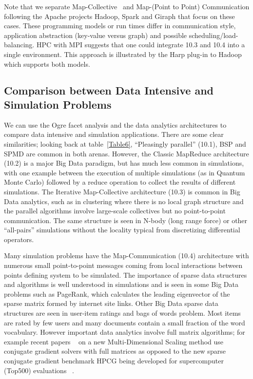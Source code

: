 \documentclass{acm_proc_article-sp}
\begin{document}
Note that we separate Map-Collective~\cite{b24,b25} and Map-(Point to Point) Communication following the Apache projects Hadoop, Spark and Giraph that focus on these cases. These programming models or run times differ in communication style, application abstraction (key-value versus graph) and possible scheduling/load-balancing. HPC with MPI suggests that one could integrate 10.3 and 10.4 into a single environment. This approach is illustrated by the Harp plug-in to Hadoop which supports both models.


\subsection{Comparison between Data Intensive and Simulation Problems}

We can use the Ogre facet analysis and the data analytics architectures to compare data intensive and simulation applications. There are some clear similarities; looking back at table~\ref{Table6}, ``Pleasingly parallel'' (10.1), BSP and SPMD are common in both arenas. However, the Classic MapReduce architecture (10.2) is a major Big Data paradigm, but has much less common in simulations, with one example between the execution of multiple simulations (as in Quantum Monte Carlo) followed by a reduce operation to collect the results of different simulations. The Iterative Map-Collective architecture (10.3) is common in Big Data analytics, such as in clustering where there is no local graph structure and the parallel algorithms involve large-scale collectives but no point-to-point communication. The same structure is seen in N-body (long range force) or other ``all-pairs'' simulations without the locality typical from discretizing differential operators.

Many simulation problems have the Map-Communication (10.4) architecture with numerous small point-to-point messages coming from local interactions between points defining system to be simulated. The importance of sparse data structures and algorithms is well understood in simulations and is seen in some Big Data problems such as PageRank, which calculates the leading eigenvector of the sparse matrix formed by internet site links. Other Big Data sparse data structures are seen in user-item ratings and bags of words problem. Most items are rated by few users and many documents contain a small fraction of the word vocabulary. However important data analytics involve full matrix algorithms; for example recent papers ~\cite{b31,b32} on a new Multi-Dimensional Scaling method use conjugate gradient solvers with full matrices as opposed to the new sparse conjugate gradient benchmark HPCG being developed for supercomputer (Top500) evaluations ~\cite{b17}.
\end{document}
